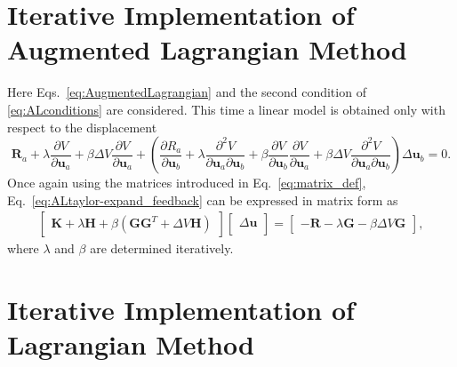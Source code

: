 \documentclass[12pt,aps,pre]{revtex4}
\begin{document}
\section{Iterative Implementation of Augmented Lagrangian Method}

Here Eqs.\ \eqref{eq:AugmentedLagrangian} and the second condition of \eqref{eq:ALconditions} are considered. This time a linear model is obtained only with respect to the displacement
%
\begin{equation}
\pmb{R}_a + \lambda \frac{\partial V}{\partial \pmb{u}_a} + \beta \Delta V \frac{\partial V}{\partial \pmb{u}_a}
%
+ \left(\frac{\partial R_a}{\partial \pmb{u}_b} + \lambda \frac{\partial^2 V}{\partial \pmb{u}_a \partial \pmb{u}_b} + \beta \frac{\partial V}{\partial \pmb{u}_b} \frac{\partial V}{\partial \pmb{u}_a} + \beta \Delta V \frac{\partial^2 V}{\partial \pmb{u}_a \partial \pmb{u}_b} \right) \Delta \pmb{u}_b  =0.
\label{eq:ALtaylor-expand_feedback}
\end{equation}
%
Once again using the matrices introduced in Eq.\ \eqref{eq:matrix_def}, Eq.\ \eqref{eq:ALtaylor-expand_feedback} can be expressed in matrix form as
%
\begin{eqnarray}
\begin{bmatrix}
\textbf{K} + \lambda \textbf{H} + \beta \left(\textbf{G} \textbf{G}^T + \Delta V \textbf{H} \right) 
\end{bmatrix}
%
\begin{bmatrix}
\Delta \textbf{u} \\
\end{bmatrix}
%
= \begin{bmatrix}
-\textbf{R}-\lambda \textbf{G} - \beta \Delta V \textbf{G}
\end{bmatrix},
\label{eq:ALtaylor-expand_matrix_feedback}
\end{eqnarray}
%
where $\lambda$ and $\beta$ are determined iteratively.

\section{Iterative Implementation of Lagrangian Method}
\end{document}
